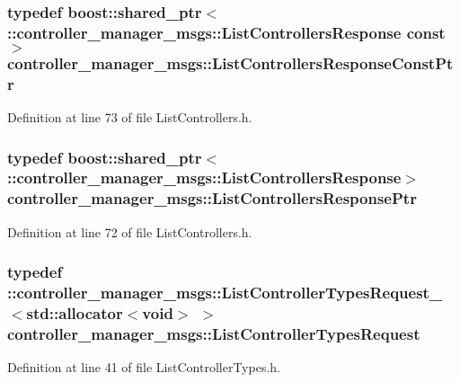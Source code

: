 \subsubsection[{\-List\-Controllers\-Response\-Const\-Ptr}]{\setlength{\rightskip}{0pt plus 5cm}typedef boost\-::shared\-\_\-ptr$<$ \-::{\bf controller\-\_\-manager\-\_\-msgs\-::\-List\-Controllers\-Response} const$>$ {\bf controller\-\_\-manager\-\_\-msgs\-::\-List\-Controllers\-Response\-Const\-Ptr}}\label{namespacecontroller__manager__msgs_a147d9cb02414d9b2e449bfa8790b88f9}


\-Definition at line 73 of file \-List\-Controllers.\-h.

\subsubsection[{\-List\-Controllers\-Response\-Ptr}]{\setlength{\rightskip}{0pt plus 5cm}typedef boost\-::shared\-\_\-ptr$<$ \-::{\bf controller\-\_\-manager\-\_\-msgs\-::\-List\-Controllers\-Response}$>$ {\bf controller\-\_\-manager\-\_\-msgs\-::\-List\-Controllers\-Response\-Ptr}}\label{namespacecontroller__manager__msgs_a92890a41b6a388298aaba1d67abfc85d}


\-Definition at line 72 of file \-List\-Controllers.\-h.

\subsubsection[{\-List\-Controller\-Types\-Request}]{\setlength{\rightskip}{0pt plus 5cm}typedef \-::{\bf controller\-\_\-manager\-\_\-msgs\-::\-List\-Controller\-Types\-Request\-\_\-}$<$std\-::allocator$<$void$>$ $>$ {\bf controller\-\_\-manager\-\_\-msgs\-::\-List\-Controller\-Types\-Request}}\label{namespacecontroller__manager__msgs_a47409c1927e966b548e23797ca922c3e}


\-Definition at line 41 of file \-List\-Controller\-Types.\-h.

